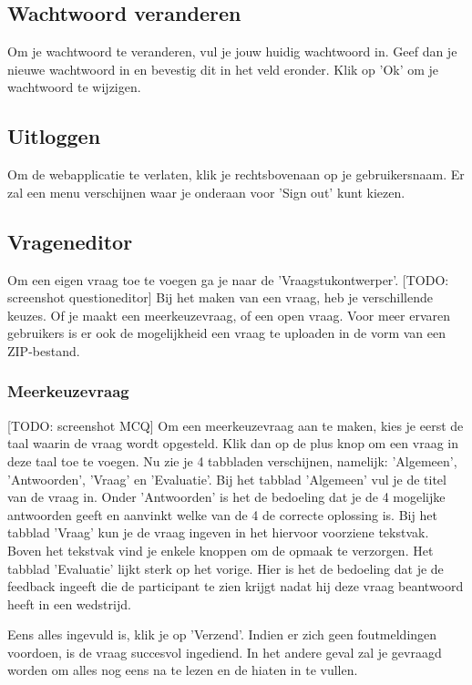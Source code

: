 \documentclass[]{article}
\begin{document}
\subsection{Wachtwoord veranderen}
Om je wachtwoord te veranderen, vul je jouw huidig wachtwoord in. Geef dan je nieuwe wachtwoord in en bevestig dit in het veld eronder. Klik op 'Ok' om je wachtwoord te wijzigen.

\subsection{Uitloggen}
Om de webapplicatie te verlaten, klik je rechtsbovenaan op je gebruikersnaam. Er zal een menu verschijnen waar je onderaan voor 'Sign out' kunt kiezen.

\subsection{Vrageneditor}

Om een eigen vraag toe te voegen ga je naar de 'Vraagstukontwerper'. [TODO: screenshot questioneditor] Bij het maken van een vraag, heb je verschillende keuzes. Of je maakt een meerkeuzevraag, of een open vraag. Voor meer ervaren gebruikers is er ook de mogelijkheid een vraag te uploaden in de vorm van een ZIP-bestand.

\subsubsection{Meerkeuzevraag}

[TODO: screenshot MCQ] Om een meerkeuzevraag aan te maken, kies je eerst de taal waarin de vraag wordt opgesteld. Klik dan op de plus knop om een vraag in deze taal toe te voegen. Nu zie je 4 tabbladen verschijnen, namelijk: 'Algemeen', 'Antwoorden', 'Vraag' en 'Evaluatie'. Bij het tabblad 'Algemeen' vul je de titel van de vraag in. Onder 'Antwoorden' is het de bedoeling dat je de 4 mogelijke antwoorden geeft en aanvinkt welke van de 4 de correcte oplossing is. Bij het tabblad 'Vraag' kun je de vraag ingeven in het hiervoor voorziene tekstvak. Boven het tekstvak vind je enkele knoppen om de opmaak te verzorgen. Het tabblad 'Evaluatie' lijkt sterk op het vorige. Hier is het de bedoeling dat je de feedback ingeeft die de participant te zien krijgt nadat hij deze vraag beantwoord heeft in een wedstrijd. 

Eens alles ingevuld is, klik je op 'Verzend'. Indien er zich geen foutmeldingen voordoen, is de vraag succesvol ingediend. In het andere geval zal je gevraagd worden om alles nog eens na te lezen en de hiaten in te vullen.
\end{document}
